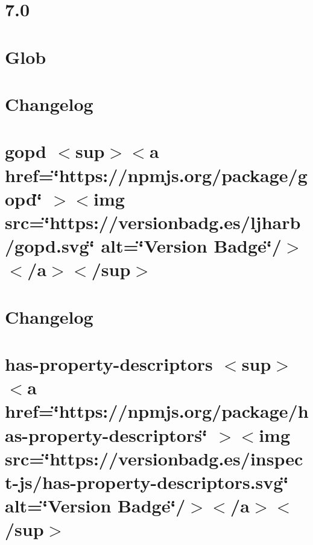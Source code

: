 \documentclass[twoside]{book}
\newcommand{\+}{\discretionary{\mbox{\scriptsize$\hookleftarrow$}}{}{}}
\begin{document}
\chapter{7.0}
\label{md_src_nodejs_node_modules_glob_changelog}

\chapter{Glob}
\label{md_src_nodejs_node_modules_glob_README}

\chapter{Changelog}
\label{md_src_nodejs_node_modules_gopd_CHANGELOG}

\chapter{gopd \texorpdfstring{$<$}{<}sup\texorpdfstring{$>$}{>}\texorpdfstring{$<$}{<}a href=\char`\"{}https\+://npmjs.\+org/package/gopd\char`\"{} \texorpdfstring{$>$}{>}\texorpdfstring{$<$}{<}img src=\char`\"{}https\+://versionbadg.\+es/ljharb/gopd.\+svg\char`\"{} alt=\char`\"{}\+Version Badge\char`\"{}/\texorpdfstring{$>$}{>}\texorpdfstring{$<$}{<}/a\texorpdfstring{$>$}{>}\texorpdfstring{$<$}{<}/sup\texorpdfstring{$>$}{>}}
\label{md_src_nodejs_node_modules_gopd_README}

\chapter{Changelog}
\label{md_src_nodejs_node_modules_has_property_descriptors_CHANGELOG}

\chapter{has-\/property-\/descriptors \texorpdfstring{$<$}{<}sup\texorpdfstring{$>$}{>}\texorpdfstring{$<$}{<}a href=\char`\"{}https\+://npmjs.\+org/package/has-\/property-\/descriptors\char`\"{} \texorpdfstring{$>$}{>}\texorpdfstring{$<$}{<}img src=\char`\"{}https\+://versionbadg.\+es/inspect-\/js/has-\/property-\/descriptors.\+svg\char`\"{} alt=\char`\"{}\+Version Badge\char`\"{}/\texorpdfstring{$>$}{>}\texorpdfstring{$<$}{<}/a\texorpdfstring{$>$}{>}\texorpdfstring{$<$}{<}/sup\texorpdfstring{$>$}{>}}
\label{md_src_nodejs_node_modules_has_property_descriptors_README}

\end{document}
